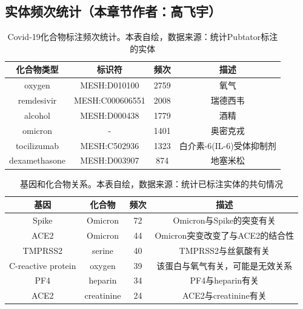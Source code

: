 \documentclass[twocolumn]{article}
\begin{document}
\subsection{实体频次统计（本章节作者：高飞宇）\label{chap:entity_count}}

\begin{table}[ht!]
	\centering
	\caption{Covid-19化合物标注频次统计。本表自绘，数据来源：统计Pubtator标注的实体}
	\begin{tabular}{cccc}
		\hline
		化合物类型 & 标识符 & 频次 & 描述\\
		\hline
		oxygen & MESH:D010100 & 2759 & 氧气\\
		remdesivir & MESH:C000606551 & 2008 & 瑞德西韦\\
		alcohol & MESH:D000438 & 1779 & 酒精\\
		omicron & - & 1401 & 奥密克戎\\
		tocilizumab & MESH:C502936 & 1323 & 白介素-6(IL-6)受体抑制剂\\
		dexamethasone & MESH:D003907 & 874 & 地塞米松\\
		\hline
	\end{tabular}
	\label{tab:mutation}
\end{table}

\begin{table}[ht!]
	\centering
	\caption{基因和化合物关系。本表自绘，数据来源：统计已标注实体的共句情况}
	\begin{tabular}{cccc}
		\hline
		基因 & 化合物 & 频次 & 描述\\
		\hline
		Spike & Omicron & 72 & Omicron与Spike的突变有关\\
		ACE2 & Omicron & 44 & Omicron突变改变了与ACE2的结合性\\
		TMPRSS2 & serine & 40 & TMPRSS2与丝氨酸有关\\
		C-reactive protein & oxygen & 39 & 该蛋白与氧气有关，可能是无效关系\\
		PF4 & heparin & 34 & PF4与heparin有关\\
		ACE2 & creatinine & 24 & ACE2与creatinine有关\\
		\hline
	\end{tabular}
	\label{tab:gene_mutation}
\end{table}
\end{document}

